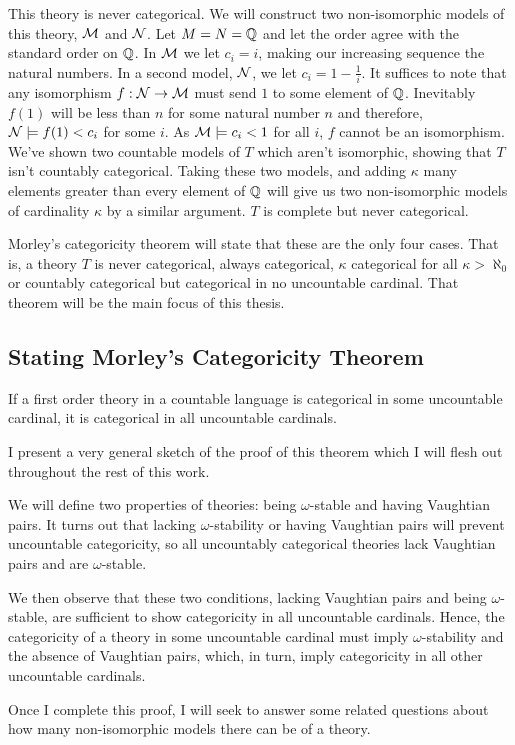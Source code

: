 \begin{example}
This theory is never categorical.
We will construct two non-isomorphic models of this theory, \(\mathcal{M}\) and \(\mathcal{N}\).
Let \(M = N = \mathbb{Q}\) and let the order agree with the standard order on \(\mathbb{Q}\). 
In \(\mathcal{M}\) we let \(c_i = i\), making our increasing sequence the natural numbers. 
In a second model, \(\mathcal{N}\), we let \(c_i = 1 - \frac{1}{i}\).
It suffices to note that any isomorphism \(f: \mathcal{N} \to \mathcal{M}\) must send \(1\) to some element of \(\mathbb{Q}\).
Inevitably \(f(1)\) will be less than \(n\) for some natural number \(n\) and therefore, \(\mathcal{N} \models f(1) < c_i\) for some \(i\).
As \(\mathcal{M} \models c_i < 1\) for all \(i\), \(f\) cannot be an isomorphism. 
We've shown two countable models of \(T\) which aren't isomorphic, showing that \(T\) isn't countably categorical. 
Taking these two models, and adding \(\kappa\) many elements greater than every element of \(\mathbb{Q}\) will give us two non-isomorphic models of cardinality \(\kappa\) by a similar argument. \(T\) is complete but never categorical. 
\end{example}

Morley's categoricity theorem will state that these are the only four cases.
That is, a theory \(T\) is never categorical, always categorical, \(\kappa\) categorical for all \(\kappa > \aleph_0\) or countably categorical but categorical in no uncountable cardinal.  
That theorem will be the main focus of this thesis. 

\subsection{Stating Morley's Categoricity Theorem}

\begin{theorem}\label{theorem_morleys_categoricity}
If a first order theory in a countable language is categorical in some uncountable cardinal, it is categorical in all uncountable cardinals. 
\end{theorem}

I present a very general sketch of the proof of this theorem which I will flesh out throughout the rest of this work. 

We will define two properties of theories: being \(\omega\)-stable and having Vaughtian pairs. 
It turns out that lacking \(\omega\)-stability or having Vaughtian pairs will prevent uncountable categoricity, so all uncountably categorical theories lack Vaughtian pairs and are \(\omega\)-stable. 

We then observe that these two conditions, lacking Vaughtian pairs and being \(\omega\)-stable, are sufficient to show categoricity in all uncountable cardinals. 
Hence, the categoricity of a theory in some uncountable cardinal must imply \(\omega\)-stability and the absence of Vaughtian pairs, which, in turn, imply categoricity in all other uncountable cardinals.

Once I complete this proof, I will seek to answer some related questions about how many non-isomorphic models there can be of a theory. 
